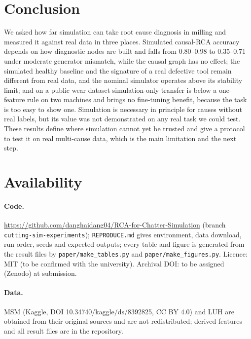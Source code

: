 \documentclass[11pt]{article}
\newcommand{\fake}[1]{{\color{red}#1}}            %
\begin{document}
\section{Conclusion}
We asked how far simulation can take root cause diagnosis in milling and measured it against real data in three places.
Simulated causal-RCA accuracy depends on how diagnostic nodes are built and falls from 0.80--0.98 to 0.35--0.71 under moderate generator mismatch, while the causal graph has no effect; the simulated healthy baseline and the signature of a real defective tool remain different from real data, and the nominal simulator operates above its stability limit; and on a public wear dataset simulation-only transfer is below a one-feature rule on two machines and brings no fine-tuning benefit, because the task is too easy to show one.
Simulation is necessary in principle for causes without real labels, but its value was not demonstrated on any real task we could test. These results define where simulation cannot yet be trusted and give a protocol to test it on real multi-cause data, which is the main limitation and the next step.

\section*{Availability}\label{sec:avail}
\begin{sloppypar}
\paragraph{Code.} \url{https://github.com/danghaidang04/RCA-for-Chatter-Simulation} (branch \texttt{cutting-sim-experiments}); \texttt{REPRODUCE.md} gives environment, data download, run order, seeds and expected outputs; every table and figure is generated from the result files by \texttt{paper/make\_tables.py} and \texttt{paper/make\_figures.py}. Licence: MIT \fake{(to be confirmed with the university)}. Archival DOI: \fake{to be assigned (Zenodo) at submission}.
\paragraph{Data.} MSM \citep{kim2026msm} (Kaggle, DOI 10.34740/kaggle/ds/8392825, CC BY 4.0) and LUH \citep{denkena2023luh} are obtained from their original sources and are not redistributed; derived features and all result files are in the repository.
\end{sloppypar}



\end{document}
